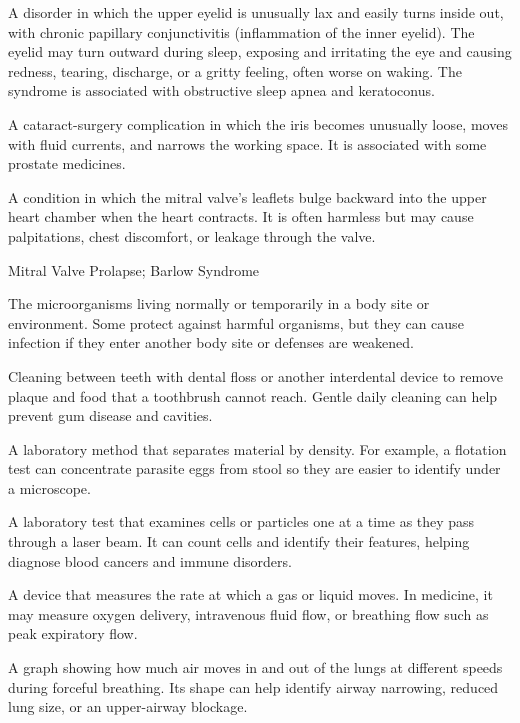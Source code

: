  A disorder in which the upper eyelid is unusually lax and easily turns inside out, with chronic papillary conjunctivitis (inflammation of the inner eyelid). The eyelid may turn outward during sleep, exposing and irritating the eye and causing redness, tearing, discharge, or a gritty feeling, often worse on waking. The syndrome is associated with obstructive sleep apnea and keratoconus.

 A cataract-surgery complication in which the iris becomes unusually loose, moves with fluid currents, and narrows the working space. It is associated with some prostate medicines.

 A condition in which the mitral valve’s leaflets bulge backward into the upper heart chamber when the heart contracts. It is often harmless but may cause palpitations, chest discomfort, or leakage through the valve.

\synonyms
Mitral Valve Prolapse; Barlow Syndrome

 The microorganisms living normally or temporarily in a body site or environment. Some protect against harmful organisms, but they can cause infection if they enter another body site or defenses are weakened.

 Cleaning between teeth with dental floss or another interdental device to remove plaque and food that a toothbrush cannot reach. Gentle daily cleaning can help prevent gum disease and cavities.

 A laboratory method that separates material by density. For example, a flotation test can concentrate parasite eggs from stool so they are easier to identify under a microscope.

 A laboratory test that examines cells or particles one at a time as they pass through a laser beam. It can count cells and identify their features, helping diagnose blood cancers and immune disorders.

 A device that measures the rate at which a gas or liquid moves. In medicine, it may measure oxygen delivery, intravenous fluid flow, or breathing flow such as peak expiratory flow.

 A graph showing how much air moves in and out of the lungs at different speeds during forceful breathing. Its shape can help identify airway narrowing, reduced lung size, or an upper-airway blockage.

